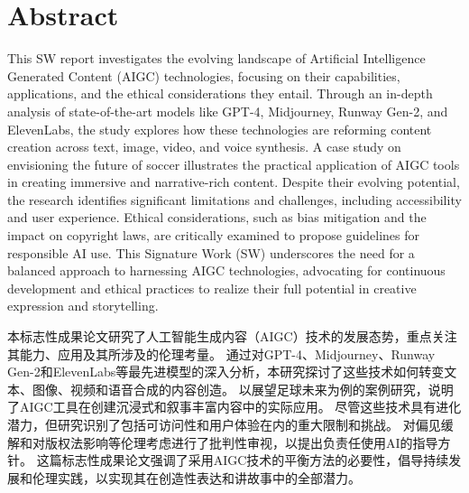\documentclass[11pt,a4paper,oneside]{report}
\begin{document}

\clearpage
{}


\setcounter{tocdepth}{1} %
\tableofcontents


\chapter*{Abstract}


This SW report investigates the evolving landscape of Artificial Intelligence Generated Content (AIGC) technologies, focusing on their capabilities, applications, and the ethical considerations they entail. 
Through an in-depth analysis of state-of-the-art models like GPT-4, Midjourney, Runway Gen-2, and ElevenLabs, the study explores how these technologies are reforming content creation across text, image, video, and voice synthesis. 
A case study on envisioning the future of soccer illustrates the practical application of AIGC tools in creating immersive and narrative-rich content. 
Despite their evolving potential, the research identifies significant limitations and challenges, including accessibility and user experience.
Ethical considerations, such as bias mitigation and the impact on copyright laws, are critically examined to propose guidelines for responsible AI use. 
This Signature Work (SW) underscores the need for a balanced approach to harnessing AIGC technologies, advocating for continuous development and ethical practices to realize their full potential in creative expression and storytelling.


\vspace{4\bigskipamount}


本标志性成果论文研究了人工智能生成内容（AIGC）技术的发展态势，重点关注其能力、应用及其所涉及的伦理考量。
通过对GPT-4、Midjourney、Runway Gen-2和ElevenLabs等最先进模型的深入分析，本研究探讨了这些技术如何转变文本、图像、视频和语音合成的内容创造。
以展望足球未来为例的案例研究，说明了AIGC工具在创建沉浸式和叙事丰富内容中的实际应用。
尽管这些技术具有进化潜力，但研究识别了包括可访问性和用户体验在内的重大限制和挑战。
对偏见缓解和对版权法影响等伦理考虑进行了批判性审视，以提出负责任使用AI的指导方针。
这篇标志性成果论文强调了采用AIGC技术的平衡方法的必要性，倡导持续发展和伦理实践，以实现其在创造性表达和讲故事中的全部潜力。
\end{document}
